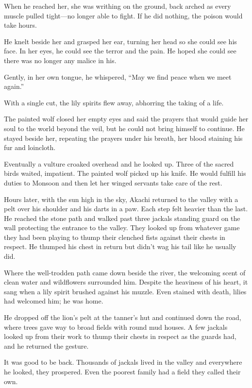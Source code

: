 When he reached her, she was writhing on the ground, back arched as every muscle pulled tight---no longer able to fight. If he did nothing, the poison would take hours. 

He knelt beside her and grasped her ear, turning her head so she could see his face. In her eyes, he could see the terror and the pain. He hoped she could see there was no longer any malice in his.

Gently, in her own tongue, he whispered, ``May we find peace when we meet again.''

With a single cut, the lily spirits flew away, abhorring the taking of a life.

The painted wolf closed her empty eyes and said the prayers that would guide her soul to the world beyond the veil, but he could not bring himself to continue. He stayed beside her, repeating the prayers under his breath, her blood staining his fur and loincloth.

Eventually a vulture croaked overhead and he looked up. Three of the sacred birds waited, impatient. The painted wolf picked up his knife. He would fulfill his duties to Monsoon and then let her winged servants take care of the rest.

\secdiv

\noindent Hours later, with the sun high in the sky, Akachi returned to the valley with a pelt over his shoulder and his darts in a paw. Each step felt heavier than the last. He reached the stone path and walked past three jackals standing guard on the wall protecting the entrance to the valley. They looked up from whatever game they had been playing to thump their clenched fists against their chests in respect. He thumped his chest in return but didn't wag his tail like he usually did.

Where the well-trodden path came down beside the river, the welcoming scent of clean water and wildflowers surrounded him. Despite the heaviness of his heart, it sang when a lily spirit brushed against his muzzle. Even stained with death, lilies had welcomed him; he was home.

He dropped off the lion's pelt at the tanner's hut and continued down the road, where trees gave way to broad fields with round mud houses. A few jackals looked up from their work to thump their chests in respect as the guards had, and he returned the gesture. 

It was good to be back. Thousands of jackals lived in the valley and everywhere he looked, they prospered. Even the poorest family had a field they called their own. 

